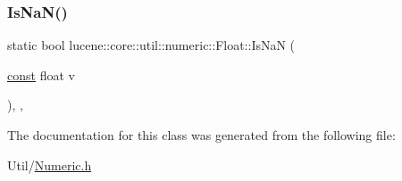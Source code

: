 \mbox{\label{classlucene_1_1core_1_1util_1_1numeric_1_1Float_ae328b61754f252fe9a40c65b26162d5b}} 
\subsubsection{\texorpdfstring{Is\+Na\+N()}{IsNaN()}}
{\footnotesize\ttfamily static bool lucene\+::core\+::util\+::numeric\+::\+Float\+::\+Is\+NaN (\begin{DoxyParamCaption}\item[{\mbox{\hyperlink{ZlibCrc32_8h_a2c212835823e3c54a8ab6d95c652660e}{const}} float}]{v }\end{DoxyParamCaption})\hspace{0.3cm}{\ttfamily [inline]}, {\ttfamily [static]}, {\ttfamily [noexcept]}}



The documentation for this class was generated from the following file\+:\begin{DoxyCompactItemize}
\item 
Util/\mbox{\hyperlink{Numeric_8h}{Numeric.\+h}}\end{DoxyCompactItemize}
